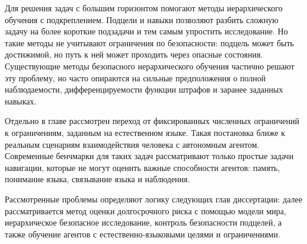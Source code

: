Для решения задач с большим горизонтом помогают методы иерархического обучения с подкреплением. Подцели и навыки позволяют разбить сложную задачу на более короткие подзадачи и тем самым упростить исследование. Но такие методы не учитывают ограничения по безопасности: подцель может быть достижимой, но путь к ней может проходить через опасные состояния. Существующие методы безопасного иерархического обучения частично решают эту проблему, но часто опираются на сильные предположения о полной наблюдаемости, дифференцируемости функции штрафов и заранее заданных навыках.

Отдельно в главе рассмотрен переход от фиксированных численных ограничений к ограничениям, заданным на естественном языке. Такая постановка ближе к реальным сценариям взаимодействия человека с автономным агентом. Современные бенчмарки для таких задач рассматривают только простые задачи навигации, которые не могут оценить важные способности агентов: память, понимание языка, связывание языка и наблюдения.

Рассмотренные проблемы определяют логику следующих глав диссертации: далее рассматривается метод оценки долгосрочного риска с помощью модели мира, иерархическое безопасное исследование, контроль безопасности подцелей, а также обучение агентов с естественно-языковыми целями и ограничениями.
